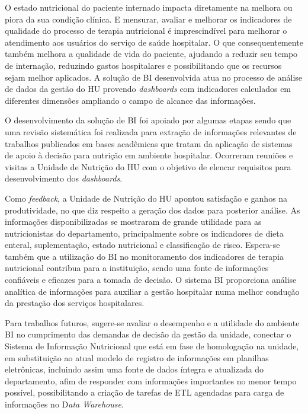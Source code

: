 O estado nutricional do paciente internado impacta diretamente na melhora ou piora da sua condição clínica. E mensurar, avaliar e melhorar os indicadores de qualidade do processo de terapia nutricional é imprescindível para melhorar o atendimento aos usuários do serviço de saúde hospitalar. O que consequentemente também melhora a qualidade de vida do paciente, ajudando a reduzir seu tempo de internação, reduzindo gastos hospitalares e possibilitando que os recursos sejam melhor aplicados. A solução de BI desenvolvida atua no processo de análise de dados da gestão do HU provendo \textit{dashboards} com indicadores calculados em diferentes dimensões ampliando o campo de alcance das informações.

O desenvolvimento da solução de BI foi apoiado por algumas etapas sendo que uma revisão sistemática foi realizada para extração de informações relevantes de trabalhos publicados em bases acadêmicas que tratam da aplicação de sistemas de apoio à decisão para nutrição em ambiente hospitalar. Ocorreram reuniões e visitas a Unidade de Nutrição do HU com o objetivo de elencar requisitos para desenvolvimento dos \textit{dashboards}.

Como \textit{feedback}, a Unidade de Nutrição do HU apontou satisfação e ganhos na produtividade, no que diz respeito a geração dos dados para posterior análise. As informações disponibilizadas se mostraram de grande utilidade para as nutricionistas do departamento, principalmente sobre os indicadores de dieta enteral, suplementação, estado nutricional e classificação de risco. Espera-se também que a utilização do BI no monitoramento dos indicadores de terapia nutricional contribua para a instituição, sendo uma fonte de informações confiáveis e eficazes para a tomada de decisão. O sistema BI proporciona análise analítica de informações para auxiliar a gestão hospitalar numa melhor condução da prestação dos serviços hospitalares.

Para trabalhos futuros, sugere-se avaliar o desempenho e a utilidade do ambiente BI no cumprimento das demandas de decisão da gestão da unidade, conectar o Sistema de Informação Nutricional que está em fase de homologação na unidade, em substituição ao atual modelo de registro de informações em planilhas eletrônicas, incluindo assim uma fonte de dados íntegra e atualizada do departamento, afim de responder com informações importantes no menor tempo possível, possibilitando a criação de tarefas de ETL agendadas para carga de informações no D\textit{ata Warehouse}.